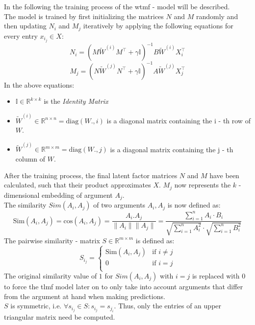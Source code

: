 \noindent In the following the training process of the \acrshort{wtmf} - model will be described.\\
The model is trained by first initializing the matrices $N$ and $M$ randomly and then updating $N_i$ and $M_j$ iteratively by applying the following equations for every entry $x_i_j \in X$:
    \begin{equation}
        N_i = (M\tilde{W}^{(i)}M^\top + \gamma\mathbb{I})^{-1}B\tilde{W}^{(i)}X^\top_i
    \end{equation}
    \begin{equation}
        M_j =(N\tilde{W}^{(j)}N^\top + \gamma\mathbb{I})^{-1}A\tilde{W}^{(j)}X^\top_j 
    \end{equation}
In the above equations:
\begin{itemize}
    \item $\mathbb{I} \in \mathbb{R}^{k \times k}$  is the \textit{Identity Matrix}
    \item $\tilde{W}^{(i)} \in \mathbb{R}^{n \times n} = \text{diag}(W.,i)$ is a diagonal matrix containing the i - th row of $W$.
    \item $\tilde{W}^{(j)} \in \mathbb{R}^{m \times m} = \text{diag}(W.,j)$ is a diagonal matrix containing the j - th column of $W$.
\end{itemize}
After the training process, the final latent factor matrices $N$ and $M$ have been calculated, such that their product approximates $X$.
$M_j$ now represents the $k$ - dimensional embedding of argument $A_j$.\\
The similarity $Sim(A_i, A_j)$ of two arguments $A_i, A_j$ is now defined as:
    \begin{equation}
        \text{Sim}(A_i, A_j) = \text{cos}(A_i, A_j) = \frac{A_i.A_j}{\|A_i\|\|A_j\|} = \frac{\sum_{i=1}^{n}A_i \cdot B_i}{\sqrt{\sum_{i=1}^{n}A_i^{2}} \cdot \sqrt{\sum_{i=1}^{n}B_i^{2}}}
    \end{equation}
The pairwise similarity - matrix $S \in \mathbb{R}^{m \times m}$ is defined as:
    \begin{equation}
        S_i_j = \left\{
	\begin{array}{ll}
		\text{Sim}(A_i, A_j)  & \mbox{if } i \neq j\\
		0 & \mbox{if } i=j \\
	\end{array}
\right.
    \end{equation}
The original similarity value of $1$ for $Sim(A_i, A_j)$ with $i=j$ is replaced with $0$ to force the \acrshort{tlmf} model later on to only take into account arguments that differ from the argument at hand when making predictions.\\
$S$ is symmetric, i.e. $\forall{s_i_j} \in S: s_i_j = s_j_i$. Thus, only the entries of an upper triangular matrix need be computed.

